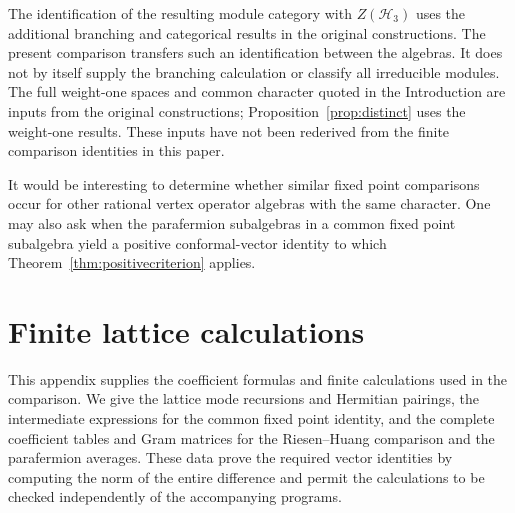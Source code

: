 \documentclass[11pt,reqno]{amsart}
\theoremstyle{definition}\newtheorem{definition}[theorem]{Definition}
\theoremstyle{remark}\newtheorem{remark}[theorem]{Remark}
\numberwithin{equation}{section}
\begin{document}
The identification of the resulting module category with $Z(\mathcal H_3)$ uses the additional branching and categorical results in the original constructions. The present comparison transfers such an identification between the algebras. It does not by itself supply the branching calculation or classify all irreducible modules. The full weight-one spaces and common character quoted in the Introduction are inputs from the original constructions; Proposition~\ref{prop:distinct} uses the weight-one results. These inputs have not been rederived from the finite comparison identities in this paper.

It would be interesting to determine whether similar fixed point comparisons occur for other rational vertex operator algebras with the same character. One may also ask when the parafermion subalgebras in a common fixed point subalgebra yield a positive conformal-vector identity to which Theorem~\ref{thm:positivecriterion} applies.

\appendix
\section{Finite lattice calculations}\label{app:checks}
This appendix supplies the coefficient formulas and finite calculations used in the comparison. We give the lattice mode recursions and Hermitian pairings, the intermediate expressions for the common fixed point identity, and the complete coefficient tables and Gram matrices for the Riesen--Huang comparison and the parafermion averages. These data prove the required vector identities by computing the norm of the entire difference and permit the calculations to be checked independently of the accompanying programs.
\end{document}

